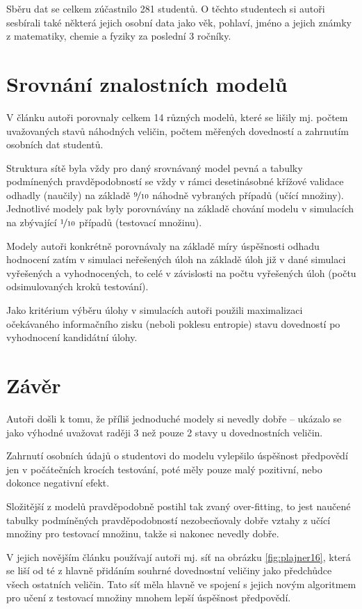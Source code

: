 \documentclass[a4paper,twoside,12pt]{book}
\begin{document}
Sběru dat se celkem zúčastnilo 281 studentů. O těchto studentech si autoři sesbírali také některá jejich osobní data jako věk, pohlaví, jméno a jejich známky z matematiky, chemie a fyziky za poslední 3 ročníky.


\section{Srovnání znalostních modelů}
V článku autoři porovnaly celkem 14 různých modelů, které se lišily mj. počtem uvažovaných stavů náhodných veličin, počtem měřených dovedností a zahrnutím osobních dat studentů.

Struktura sítě byla vždy pro daný srovnávaný model pevná a tabulky podmínených pravděpodobností se vždy v rámci desetinásobné křížové validace odhadly (naučily) na základě $\nicefrac{9}{10}$ náhodně vybraných případů (učící množiny). Jednotlivé modely pak byly porovnávány na základě chování modelu v simulacích na zbývající $\nicefrac{1}{10}$ případů (testovací množinu).

Modely autoři konkrétně porovnávaly na základě míry úspěšnosti odhadu hodnocení zatím v simulaci neřešených úloh na základě úloh již v dané simulaci vyřešených a vyhodnocených, to celé v závislosti na počtu vyřešených úloh (počtu odsimulovaných kroků testování).

Jako kritérium výběru úlohy v simulacích autoři použili maximalizaci očekávaného informačního zisku (neboli poklesu entropie) stavu dovedností po vyhodnocení kandidátní úlohy.

\section{Závěr}
Autoři došli k tomu, že příliš jednoduché modely si nevedly dobře -- ukázalo se jako výhodné uvažovat raději 3 než pouze 2 stavy u dovednostních veličin.

Zahrnutí osobních údajů o studentovi do modelu vylepšilo úspěšnost předpovědí jen v počátečních krocích testování, poté měly pouze malý pozitivní, nebo dokonce negativní efekt.

Složitější z modelů pravděpodobně postihl tak zvaný over-fitting, to jest naučené tabulky podmíněných pravděpodobností nezobecňovaly dobře vztahy z učící množiny pro testovací množinu, takže si nakonec nevedly dobře.

V jejich novějším článku \cite{plajner16} používají autoři mj. síť na obrázku \ref{fig:plajner16}, která se liší od té z \cite{vomlel_plajner2015} hlavně přidáním souhrné dovednostní veličiny jako předchůdce všech ostatních veličin. Tato síť měla hlavně ve spojení s jejich novým algoritmem pro učení z testovací množiny mnohem lepší úspěšnost předpovědí.
\end{document}
